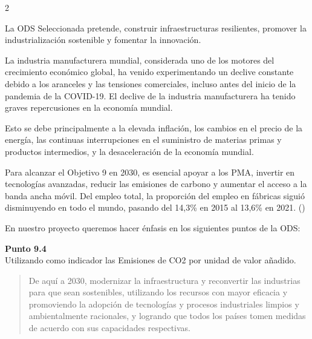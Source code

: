 \begin{multicols*}{2}

\begin{center}
  
  \label{fig:introduccion}
\end{center}

La ODS Seleccionada pretende, construir infraestructuras resilientes, promover la industrialización sostenible y fomentar la innovación.

\vspace{0.5 em}

La industria manufacturera mundial, considerada uno de los motores del crecimiento económico global, ha venido experimentando un declive constante debido a los aranceles y las tensiones comerciales, incluso antes del inicio de la pandemia de la COVID-19. El declive de la industria manufacturera ha tenido graves repercusiones en la economía mundial.

\vspace{0.5 em}

Esto se debe principalmente a la elevada inflación, los cambios en el precio de la energía, las continuas interrupciones en el suministro de materias primas y productos intermedios, y la desaceleración de la economía mundial. 

\vspace{0.5 em}

Para alcanzar el Objetivo 9 en 2030, es esencial apoyar a los PMA, invertir en tecnologías avanzadas, reducir las emisiones de carbono y aumentar el acceso a la banda ancha móvil.
Del empleo total, la proporción del empleo en fábricas siguió disminuyendo en todo el mundo, pasando del 14,3\% en 2015 al 13,6\% en 2021. (\cite{un_desarrollo_sostenible_2015})

\vspace{0.75 em}

En nuestro proyecto queremos hacer énfasis en los siguientes puntos de la ODS: 
\vspace{0.5 em}

\textbf{Punto 9.4} \\
Utilizando como indicador las Emisiones de CO2 por unidad de valor añadido.

\begin{quote}
De aquí a 2030, modernizar la infraestructura y reconvertir las industrias para que sean sostenibles, utilizando los recursos con mayor eficacia y promoviendo la adopción de tecnologías y procesos industriales limpios y ambientalmente racionales, y logrando que todos los países tomen medidas de acuerdo con sus capacidades respectivas.
\end{quote}


\end{multicols*}
